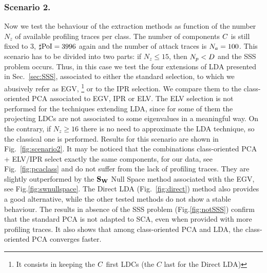 \subsubsection{Scenario 2.}
Now we test the behaviour of the extraction methods as function of the number $N_z$ of available profiling traces per class. The number of components $C$ is still fixed to 3, $\sharp\mathrm{PoI}=3996$ again and the number of attack traces is $N_a=100$. This scenario has to be divided into two parts: if $N_z\leq 15$, then $N_p<D$ and the SSS problem occurs. Thus, in this case we test the four extensions of LDA presented in Sec.~\ref{sec:SSS}, associated to either the standard selection, to which we abusively refer as EGV,%
\footnote{It consists in keeping the $C$ first LDCs (the $C$ last for the Direct LDA)}
or to the IPR selection.  We compare them to the class-oriented PCA associated to EGV, IPR or ELV. The ELV selection is not performed for the techniques extending LDA, since for some of them the projecting LDCs are not associated to some eigenvalues in a meaningful way. On the contrary, if $N_z\geq 16$ there is no need to approximate the LDA technique, so the classical one is performed. Results for this scenario are shown in Fig.~\ref{fig:scenario2}. It may be noticed that the combinations class-oriented PCA + ELV/IPR select exactly the same components, for our data, see Fig.~\ref{fig:pcaclass} and do not suffer from the lack of profiling traces. They are slightly outperformed by the $\textbf{S}_{\textbf{W}}$ Null Space method associated with the EGV, see Fig.\ref{fig:swnullspace}. The Direct LDA (Fig.~\ref{fig:direct}) method also provides a good alternative, while the other tested methods do not show a stable behaviour. The results in absence of the SSS problem (Fig.\ref{fig:notSSS}) confirm that the standard PCA is not adapted to SCA, even when provided with more profiling traces. It also shows that among class-oriented PCA and LDA, the class-oriented PCA converges faster.



